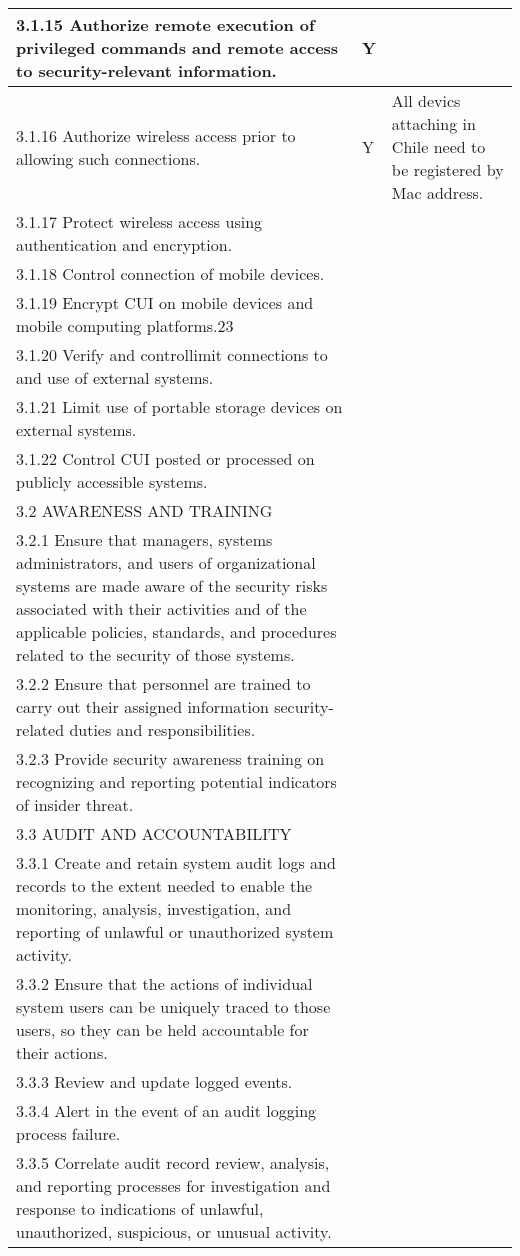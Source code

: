 \begin{longtable} {|p{}|p{}|p{} |}
{3.1.15 Authorize remote execution of privileged commands and remote access to security-relevant information.}&{Y}& \\ \hline
{3.1.16 Authorize wireless access prior to allowing such connections.}&{Y}&{All devics attaching in Chile need to be registered by Mac address.} \\ \hline
{3.1.17 Protect wireless access using authentication and encryption.}&& \\ \hline
{3.1.18 Control connection of mobile devices.}&& \\ \hline
{3.1.19 Encrypt CUI on mobile devices and mobile computing platforms.23}&& \\ \hline
{3.1.20 Verify and control\/limit connections to and use of external systems.}&& \\ \hline
{3.1.21 Limit use of portable storage devices on external systems.}&& \\ \hline
{3.1.22 Control CUI posted or processed on publicly accessible systems.}&& \\ \hline
{3.2 AWARENESS AND TRAINING}&& \\ \hline
{3.2.1 Ensure that managers, systems administrators, and users of organizational systems are made aware of the security risks associated with their activities and of the applicable policies, standards, and procedures related to the security of those systems.}&& \\ \hline
{3.2.2 Ensure that personnel are trained to carry out their assigned information security-related duties and responsibilities.}&& \\ \hline
{3.2.3 Provide security awareness training on recognizing and reporting potential indicators of insider threat.}&& \\ \hline
{3.3 AUDIT AND ACCOUNTABILITY}&& \\ \hline
{3.3.1 Create and retain system audit logs and records to the extent needed to enable the monitoring, analysis, investigation, and reporting of unlawful or unauthorized system activity.}&& \\ \hline
{3.3.2 Ensure that the actions of individual system users can be uniquely traced to those users, so they can be held accountable for their actions.}&& \\ \hline
{3.3.3 Review and update logged events.}&& \\ \hline
{3.3.4 Alert in the event of an audit logging process failure.}&& \\ \hline
{3.3.5 Correlate audit record review, analysis, and reporting processes for investigation and response to indications of unlawful, unauthorized, suspicious, or unusual activity.}&& \\ \hline

\end{longtable}
